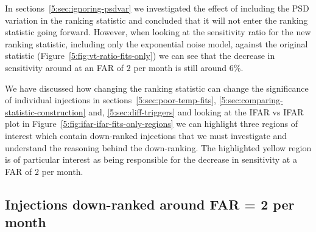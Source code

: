 In sections~\ref{5:sec:ignoring-psdvar} we investigated the effect of including the PSD variation in the ranking statistic and concluded that it will not enter the ranking statistic going forward. However, when looking at the sensitivity ratio for the new ranking statistic, including only the exponential noise model, against the original statistic (Figure~\ref{5:fig:vt-ratio-fits-only}) we can see that the decrease in sensitivity around at an FAR of $2$ per month is still around $6\%$.

We have discussed how changing the ranking statistic can change the significance of individual injections in sections~\ref{5:sec:poor-temp-fits}, \ref{5:sec:comparing-statistic-construction} and, \ref{5:sec:diff-triggers} and looking at the IFAR vs IFAR plot in Figure~\ref{5:fig:ifar-ifar-fits-only-regions} we can highlight three regions of interest which contain down-ranked injections that we must investigate and understand the reasoning behind the down-ranking. The highlighted yellow region is of particular interest as being responsible for the decrease in sensitivity at a FAR of $2$ per month.

\subsection{\label{5:sec:bottom-left-region}Injections down-ranked around FAR = 2 per month}

